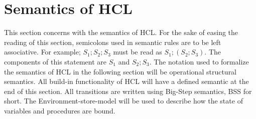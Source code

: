 \newpage
\section{Semantics of HCL}
This section concerns with the semantics of HCL.
For the sake of easing the reading of this section, semicolons used in semantic rules are to be left associative.
For example; $S_1;S_2;S_3$ must be read as $S_1;(S_2;S_3)$.
The components of this statement are $S_1$ and $S_2;S_3$.
The notation used to formalize the semantics of HCL in the following section will be operational structural semantics.
All build-in functionality of HCL will have a defined semantic at the end of this section.
All transitions are written using Big-Step semantics, BSS for short.
The Environment-store-model will be used to describe how the state of variables and procedures are bound.
